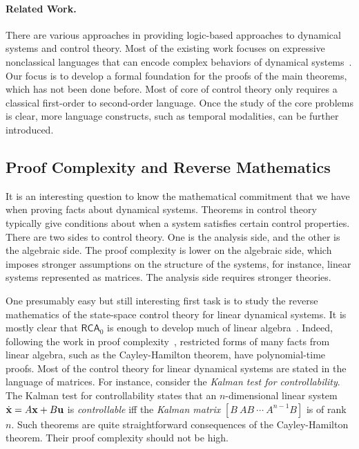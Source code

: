 \documentclass[11pt]{article}
\theoremstyle{definition}
\begin{document}
\paragraph{Related Work. } There are various approaches in providing logic-based approaches to dynamical systems and control theory. Most of the existing work focuses on expressive nonclassical languages that can encode complex behaviors of dynamical systems~\cite{DBLP:conf/lics/Platzer12}. Our focus is to develop a formal foundation for the proofs of the main theorems, which has not been done before. Most of core of control theory only requires a classical first-order to second-order language. Once the study of the core problems is clear, more language constructs, such as temporal modalities, can be further introduced. 

\subsection{Proof Complexity and Reverse Mathematics} 

It is an interesting question to know the mathematical commitment that we have when proving facts about dynamical systems. Theorems in control theory typically give conditions about when a system satisfies certain control properties. There are two sides to control theory. One is the analysis side, and the other is the algebraic side. The proof complexity is lower on the algebraic side, which imposes stronger assumptions on the structure of the systems, for instance, linear systems represented as matrices. The analysis side requires stronger theories. 

One presumably easy but still interesting first task is to study the reverse mathematics of the state-space control theory for linear dynamical systems. It is mostly clear that $\mathsf{RCA}_0$ is enough to develop much of linear algebra~\cite{Simpson}. Indeed, following the work in proof complexity~\cite{cookbook}, restricted forms of many facts from linear algebra, such as the Cayley-Hamilton theorem, have polynomial-time proofs. Most of the control theory for linear dynamical systems are stated in the language of matrices. For instance, consider the {\em Kalman test for controllability}. The Kalman test for controllability states that an $n$-dimensional linear system $\dot {\bf x} = A{\bf x}+B{\bf u}$ is {\em controllable} iff the {\em Kalman matrix}
$[B\ AB\ \cdots\ A^{n-1}B]$ is of rank $n$. Such theorems are quite straightforward consequences of the Cayley-Hamilton theorem. Their proof complexity should not be high. 
\end{document}
